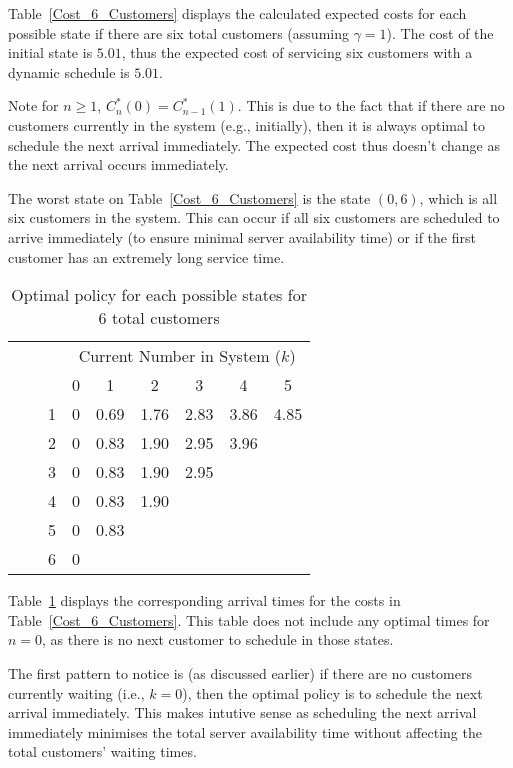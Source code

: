 Table~\ref{Cost_6_Customers} displays the calculated expected costs for each possible state if there are six total customers (assuming $\gamma = 1$). The cost of the initial state is $5.01$, thus the expected cost of servicing six customers with a dynamic schedule is $5.01$.

Note for $n \geq 1$, $C_{n}^{*} (0) = C_{n - 1}^{*} (1)$. This is due to the fact that if there are no customers currently in the system (e.g., initially), then it is always optimal to schedule the next arrival immediately. The expected cost thus doesn't change as the next arrival occurs immediately.

The worst state on Table~\ref{Cost_6_Customers} is the state $(0, 6)$, which is all six customers in the system. This can occur if all six customers are scheduled to arrive immediately (to ensure minimal server availability time) or if the first customer has an extremely long service time.

\begin{table}[htb]
	\centering
	\begin{tabular}{c c c || c | c | c | c | c | c}
		& & & \multicolumn{6}{c}{Current Number in System ($k$)} \\
		& & & 0 & 1 & 2 & 3 & 4 & 5 \\ \hline \hline
		\parbox[t]{2mm}{} & \parbox[t]{2mm}{} & 1 & 0 & 0.69 & 1.76 & 2.83 & 3.86 & 4.85 \\
		& & 2 & 0 & 0.83 & 1.90 & 2.95 & 3.96 \\
		& & 3 & 0 & 0.83 & 1.90 & 2.95 & \\
		& & 4 & 0 & 0.83 & 1.90 & & \\
		& & 5 & 0 & 0.83 & & & \\
		& & 6 & 0 & & & &
	\end{tabular}
	\caption{Optimal policy for each possible states for 6 total customers}
	\label{Policy_6_Customers}
\end{table}

Table~\ref{Policy_6_Customers} displays the corresponding arrival times for the costs in Table~\ref{Cost_6_Customers}. This table does not include any optimal times for $n = 0$, as there is no next customer to schedule in those states.

The first pattern to notice is (as discussed earlier) if there are no customers currently waiting (i.e., $k = 0$), then the optimal policy is to schedule the next arrival immediately. This makes intutive sense as scheduling the next arrival immediately minimises the total server availability time without affecting the total customers' waiting times.

